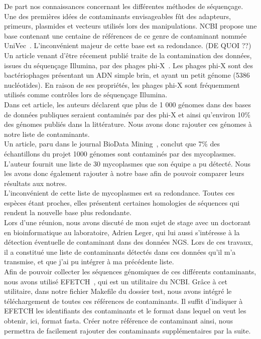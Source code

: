 \documentclass[a4paper,12pt]{article}
\begin{document}
De part nos connaissances concernant les différentes méthodes de séquençage. Une des premières idées de contaminants envisageables fût des adapteurs, primeurs, plasmides et vecteurs utilisés lors des manipulations. NCBI propose une base contenant une centaine de références de ce genre de contaminant nommée UniVec~\cite{UniVec}. L'inconvénient majeur de cette base est sa redondance. (DE QUOI ??)\\

Un article venant d'être récement publié traite de la contamination des données, issues du séquençage Illumina, par des phages phi-X~\cite{phiX}. Les phages phi-X sont des bactériophages présentant un ADN simple brin, et ayant un petit génome (5386 nucléotides). En raison de ses propriétés, les phages phi-X sont fréquemment utilisés comme contrôles lors de séquençage Illumina. \\ 
Dans cet article, les auteurs déclarent que plus de 1 000 génomes dans des bases de données publiques seraient contaminés par des phi-X et ainsi qu'environ 10\% des génomes publiés dans la littérature. Nous avons donc rajouter ces génomes à notre liste de contaminants.\\

Un article, paru dans le journal BioData Mining~\cite{mycoplasme}, conclut que 7\% des échantillons du projet 1000 génomes sont contaminés par des mycoplasmes. L'auteur fournit une liste de 30 mycoplasmes que son équipe a pu détecté. Nous les avons donc également rajouter à notre base afin de pouvoir comparer leurs résultats aux notres.\\ 
L'inconvénient de cette liste de mycoplasmes est sa redondance. Toutes ces espèces étant proches, elles présentent certaines homologies de séquences qui rendent la nouvelle base plus redondante. \\

Lors d'une réunion, nous avons discuté de mon sujet de stage avec un doctorant en bioinformatique au laboratoire, Adrien Leger, qui lui aussi s'intéresse à la détection éventuelle de contaminant dans des données NGS. Lors de ces travaux, il a constitué une liste de contaminants détectés dans ces données qu'il m'a transmise, et que j'ai pu intégrer à ma précédente liste.\\

Afin de pouvoir collecter les séquences génomiques de ces différents contaminants, nous avons utilisé EFETCH~\cite{efetch}, qui est un utilitaire du NCBI. Grâce à cet utilitaire, dans notre fichier Makefile du dossier test, nous avons intégré le téléchargement de toutes ces références de contaminants. Il suffit d'indiquer à EFETCH les identifiants des contaminants et le format dans lequel on veut les obtenir, ici, format fasta. Créer notre référence de contaminant ainsi, nous  permettra de facilement rajouter des contaminants supplémentaires par la suite. 
\end{document}
